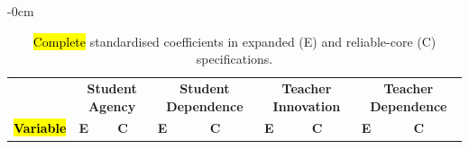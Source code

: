 \documentclass[sustainability,article,accept,moreauthors]{Definitions/mdpi}
\begin{document}
\setlength{\tabcolsep}{3.5pt}
\begin{table}[H] 
\caption{\hl{Complete} %
 standardised coefficients in expanded (E) and reliable-core (C) specifications.}\label{tab:fullcoeffs}
 \footnotesize

\begin{adjustwidth}{-\extralength}{0cm}
\setlength{\tabcolsep}{1.37mm}\begin{tabular}{p{4cm}*{8}{p{1.5cm}}}

\toprule
& \multicolumn{2}{c}{\textbf{Student Agency}} & \multicolumn{2}{c}{\textbf{Student Dependence}} & \multicolumn{2}{c}{\textbf{Teacher Innovation}} & \multicolumn{2}{c}{\textbf{Teacher Dependence}}\\
\cmidrule(l){2-9}
\multirow{-2.5}{*}{\textbf{\hl{Variable} %
}} & \textbf{E} & \textbf{C} & \textbf{E} & \textbf{C} & \textbf{E} & \textbf{C} & \textbf{E} & \textbf{C}\\
\midrule




\end{tabular}
\end{adjustwidth}
\end{table}
\end{document}
